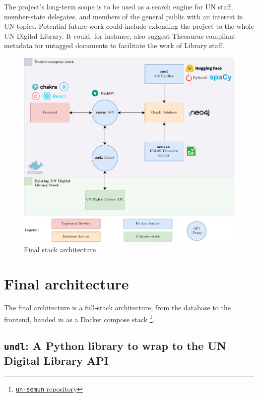 \documentclass[11pt]{article}
\begin{document}
The project's long-term scope is to be used as a search engine for UN staff, member-state delegates, and members of the general public with an interest in UN topics. Potential future work could include extending the project to the whole UN Digital Library. It could, for instance, also suggest Thesaurus-compliant metadata for untagged documents to facilitate the work of Library staff.


\begin{figure}[!htb]
    \centering
    \includegraphics[width=\textwidth]{res/architecture-final.pdf}
    \caption{Final stack architecture}

    \label{fig:architecture}
\end{figure}

\section{Final architecture} \label{sec:final-architecture}

The final architecture is a full-stack architecture, from the database to the frontend, handed in as a Docker compose stack \footnote{\href{https://github.com/ClementSicard/un-semun}{\faGithub{} \texttt{un-semun} repository}}.

\subsection{\texttt{undl}: A Python library to wrap to the UN Digital Library API} \label{ssec:undl-a-python-library-to-wrap-to-the-un-digital-library-api}
\end{document}
